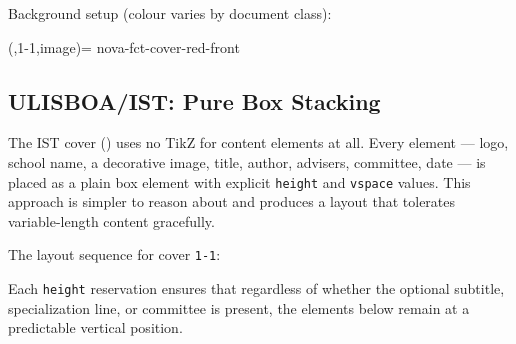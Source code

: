 Background setup (colour varies by document class):
\begin{latexcode}
\def\@novafctcovercolor{red}          %
\ifdocclass{msc}{\def\@novafctcovercolor{blue}}{}
\ifdocclass{phd}{\def\@novafctcovercolor{green}}{}
\SetThesisCover*(\@DOCTYPE,1-1,image)=
    {nova-fct-cover-\@novafctcovercolor-front}
\end{latexcode}


\subsection{ULISBOA/IST: Pure  Box Stacking}
\label{sec:covers_ist}

The IST cover
()
uses no TikZ for content elements at all.  Every element — logo, school
name, a decorative image, title, author, advisers, committee, date — is
placed as a plain box element with explicit \texttt{height} and
\texttt{vspace} values.  This approach is simpler to reason about and
produces a layout that tolerates variable-length content gracefully.

The layout sequence for cover \texttt{1-1}:
\begin{latexcode}
\end{latexcode}

Each \texttt{height} reservation ensures that regardless of whether the
optional subtitle, specialization line, or committee is present, the
elements below remain at a predictable vertical position.


